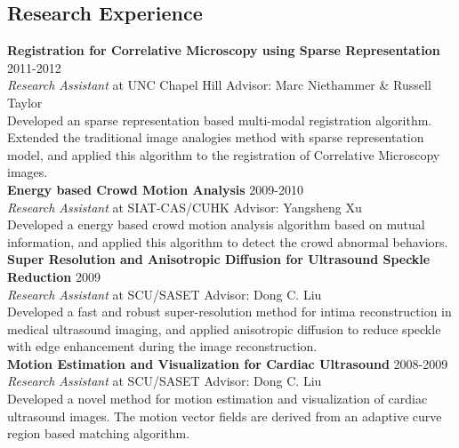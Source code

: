 \documentclass[line,margin]{res}
\begin{document}
\begin{resume}
 
\section{\sc Research Experience} 
\smallskip

\textbf{Registration for Correlative Microscopy using Sparse Representation} \hfill      2011-2012 \\
\textit{ Research Assistant} at UNC Chapel Hill  \hfill {Advisor: Marc Niethammer \& Russell Taylor}\\
Developed an sparse representation based multi-modal registration algorithm. Extended the traditional image analogies method with sparse representation model, and applied this algorithm to the registration of Correlative Microscopy images.\vspace{.05in}
\\ %
\textbf{Energy based Crowd Motion Analysis} \hfill      2009-2010 \\
\textit{Research Assistant} at SIAT-CAS/CUHK \hfill {Advisor: Yangsheng Xu}\\
Developed a energy based crowd motion analysis algorithm based on mutual information, and
applied this algorithm to detect the crowd abnormal behaviors.\vspace{.05in}
\\ %
\textbf{Super Resolution and Anisotropic Diffusion for Ultrasound Speckle Reduction} \hfill      2009 \\
\textit{Research Assistant} at SCU/SASET \hfill {Advisor: Dong C. Liu}\\
Developed a fast and robust super-resolution method for intima reconstruction in medical
ultrasound imaging, and applied anisotropic diffusion to reduce speckle with edge enhancement during the image reconstruction.\vspace{.05in}
\\ %
\textbf{Motion Estimation and Visualization for Cardiac Ultrasound} \hfill      2008-2009 \\
\textit{Research Assistant} at SCU/SASET \hfill {Advisor: Dong C. Liu}\\
Developed a novel method for motion estimation and visualization of cardiac ultrasound images. The motion vector fields are derived from an adaptive curve region based matching algorithm.


\end{resume}
\end{document}
